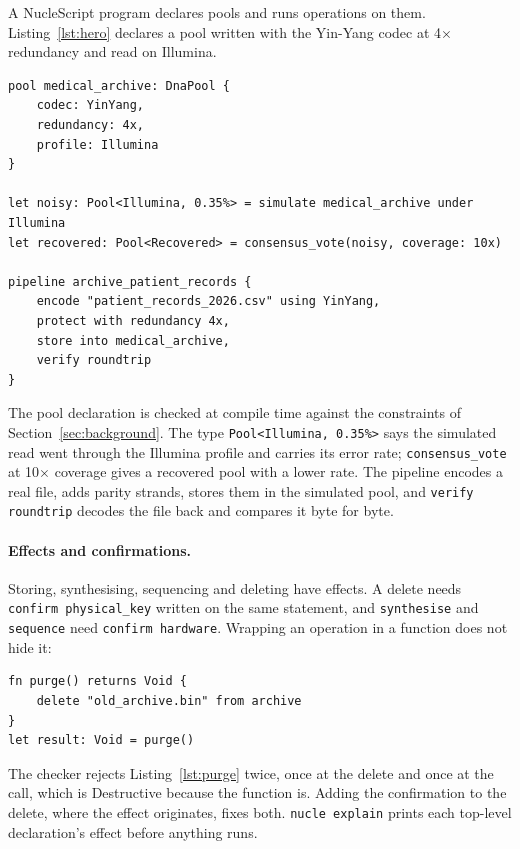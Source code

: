 \documentclass[11pt,a4paper]{article}
\newcommand{\nsl}[1]{\texttt{#1}}
\begin{document}
A NucleScript program declares pools and runs operations on them.
Listing~\ref{lst:hero} declares a pool written with the Yin-Yang codec at
4$\times$ redundancy and read on Illumina.

\begin{lstlisting}[caption={A pool, a simulated read, a consensus and a pipeline (\texttt{hero.nsl}).},label=lst:hero]
pool medical_archive: DnaPool {
    codec: YinYang,
    redundancy: 4x,
    profile: Illumina
}

let noisy: Pool<Illumina, 0.35%> = simulate medical_archive under Illumina
let recovered: Pool<Recovered> = consensus_vote(noisy, coverage: 10x)

pipeline archive_patient_records {
    encode "patient_records_2026.csv" using YinYang,
    protect with redundancy 4x,
    store into medical_archive,
    verify roundtrip
}
\end{lstlisting}

The pool declaration is checked at compile time against the constraints
of Section~\ref{sec:background}. The type \nsl{Pool<Illumina, 0.35\%>}
says the simulated read went through the Illumina profile and carries
its error rate; \nsl{consensus\_vote} at 10$\times$ coverage gives a
recovered pool with a lower rate. The pipeline encodes a real file,
adds parity strands, stores them in the simulated pool, and
\nsl{verify roundtrip} decodes the file back and compares it byte for
byte.

\paragraph{Effects and confirmations.} Storing, synthesising, sequencing
and deleting have effects. A delete needs \nsl{confirm physical\_key}
written on the same statement, and \nsl{synthesise} and \nsl{sequence}
need \nsl{confirm hardware}. Wrapping an operation in a function does not
hide it:

\begin{lstlisting}[caption={A delete inside a function, without its confirmation.},label=lst:purge]
fn purge() returns Void {
    delete "old_archive.bin" from archive
}
let result: Void = purge()
\end{lstlisting}

The checker rejects Listing~\ref{lst:purge} twice, once at the delete and
once at the call, which is Destructive because the function is. Adding
the confirmation to the delete, where the effect originates, fixes both.
\nsl{nucle explain} prints each top-level declaration's effect before
anything runs.
\end{document}

